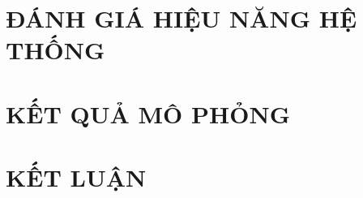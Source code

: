 \documentclass[10pt,conference,a4paper]{IEEEtran}
\begin{document}

%
\section{ĐÁNH GIÁ HIỆU NĂNG HỆ THỐNG}
\label{Sec:DanhGiaHieuNangHeThong}
%




%
\section{KẾT QUẢ MÔ PHỎNG}
\label{Sec:KetQuaMoPhong}
%

%
\section{KẾT LUẬN}
\label{Sec:KetLuan}
%


\balance

%
\end{document}
